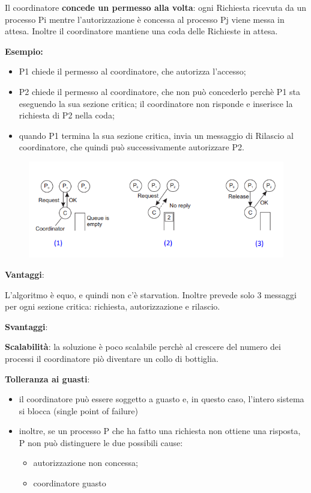 \documentclass{article}
\begin{document}
Il coordinatore \textbf{concede un permesso alla volta}: ogni Richiesta ricevuta da un processo Pi mentre l'autorizzazione è concessa al processo Pj viene messa in attesa. Inoltre
il coordinatore mantiene una coda delle Richieste in attesa.

\vspace{5mm}
\textbf{Esempio:}

\vspace{3mm}
\begin{itemize}
    \item P1 chiede il permesso al coordinatore, che autorizza l'accesso;
    \item P2 chiede il permesso al coordinatore, che non può concederlo perchè P1 sta eseguendo la sua sezione critica; il coordinatore non risponde e inserisce la richiesta di P2 nella coda;
    \item quando P1 termina la sua sezione critica, invia un messaggio di Rilascio al coordinatore, che quindi può successivamente autorizzare P2.
\end{itemize}

\begin{figure}[htbp]
    \centering
    \includegraphics[width=0.70\columnwidth]{imgs/mutua_centrale.PNG}
\end{figure}

\vspace{3mm}
\textbf{Vantaggi}:

L'algoritmo è equo, e quindi non c'è starvation. Inoltre prevede solo 3 messaggi per ogni sezione critica: richiesta, autorizzazione e rilascio.

\vspace{3mm}
\textbf{Svantaggi}:

\textbf{Scalabilità}: la soluzione è poco scalabile perchè al crescere del numero dei processi il coordinatore piò diventare un collo di bottiglia.

\textbf{Tolleranza ai guasti}:
\begin{itemize}
    \item il coordinatore può essere soggetto a guasto e, in questo caso, l'intero sistema si blocca (single point of failure)
    \item inoltre, se un processo P che ha fatto una richiesta non ottiene una risposta, P non può distinguere le due possibili cause:
    \begin{itemize}
        \item autorizzazione non concessa;
        \item coordinatore guasto
    \end{itemize}
\end{itemize}
\end{document}
